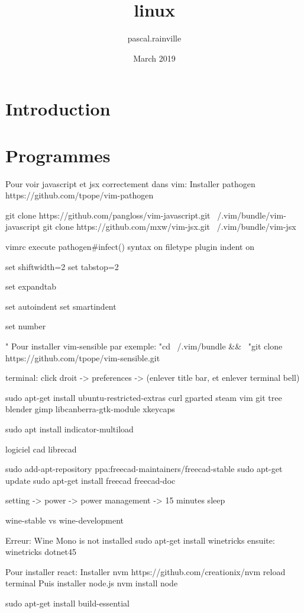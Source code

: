 \documentclass{article}
\title{linux}
\author{pascal.rainville }
\date{March 2019}
\begin{document}
\maketitle

\section{Introduction}

\section{Programmes}
  
Pour voir javascript et jsx correctement dans vim:
Installer pathogen
https://github.com/tpope/vim-pathogen

git clone https://github.com/pangloss/vim-javascript.git ~/.vim/bundle/vim-javascript
git clone https://github.com/mxw/vim-jsx.git ~/.vim/bundle/vim-jsx

vimrc
execute pathogen#infect()
syntax on
filetype plugin indent on

set shiftwidth=2
set tabstop=2

set expandtab

set autoindent
set smartindent

set number

" Pour installer vim-sensible par exemple:
"cd ~/.vim/bundle && \
"git clone https://github.com/tpope/vim-sensible.git
  
terminal:
click droit -> preferences -> (enlever title bar, et enlever terminal bell)


sudo apt-get install ubuntu-restricted-extras curl gparted steam vim git tree blender gimp libcanberra-gtk-module xkeycaps

sudo apt install indicator-multiload

logiciel cad
 librecad

sudo add-apt-repository ppa:freecad-maintainers/freecad-stable
sudo apt-get update
sudo apt-get install freecad freecad-doc

setting -> power -> power management -> 15 minutes sleep

wine-stable vs wine-development

Erreur: Wine Mono is not installed
sudo apt-get install winetricks
ensuite:
winetricks dotnet45

Pour installer react:
Installer nvm
https://github.com/creationix/nvm
reload terminal
Puis installer node.js
nvm install node

sudo apt-get install build-essential
\end{document}
